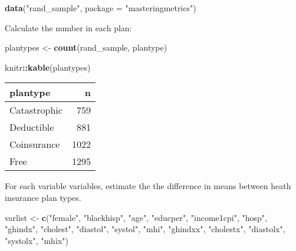 \documentclass[]{book}
\newenvironment{Shaded}{\begin{snugshade}}{\end{snugshade}}
\newcommand{\DataTypeTok}[1]{\textcolor[rgb]{0.13,0.29,0.53}{#1}}
\newcommand{\KeywordTok}[1]{\textcolor[rgb]{0.13,0.29,0.53}{\textbf{#1}}}
\newcommand{\NormalTok}[1]{#1}
\newcommand{\OperatorTok}[1]{\textcolor[rgb]{0.81,0.36,0.00}{\textbf{#1}}}
\newcommand{\StringTok}[1]{\textcolor[rgb]{0.31,0.60,0.02}{#1}}
\theoremstyle{definition}
\theoremstyle{definition}
\theoremstyle{definition}
\theoremstyle{remark}
\begin{document}
\begin{Shaded}
\begin{Highlighting}[]
\KeywordTok{data}\NormalTok{(}\StringTok{"rand_sample"}\NormalTok{, }\DataTypeTok{package =} \StringTok{"masteringmetrics"}\NormalTok{)}
\end{Highlighting}
\end{Shaded}

Calculate the number in each plan:

\begin{Shaded}
\begin{Highlighting}[]
\NormalTok{plantypes <-}\StringTok{ }\KeywordTok{count}\NormalTok{(rand_sample, plantype)}
\end{Highlighting}
\end{Shaded}

\begin{Shaded}
\begin{Highlighting}[]
\NormalTok{knitr}\OperatorTok{::}\KeywordTok{kable}\NormalTok{(plantypes)}
\end{Highlighting}
\end{Shaded}

\begin{tabular}{l|r}
\hline
plantype & n\\
\hline
Catastrophic & 759\\
\hline
Deductible & 881\\
\hline
Coinsurance & 1022\\
\hline
Free & 1295\\
\hline
\end{tabular}

For each variable variables, estimate the the difference in means
between heath insurance plan types.

\begin{Shaded}
\begin{Highlighting}[]
\NormalTok{varlist <-}\StringTok{ }\KeywordTok{c}\NormalTok{(}\StringTok{"female"}\NormalTok{, }\StringTok{"blackhisp"}\NormalTok{, }\StringTok{"age"}\NormalTok{, }\StringTok{"educper"}\NormalTok{,}
             \StringTok{"income1cpi"}\NormalTok{, }\StringTok{"hosp"}\NormalTok{, }\StringTok{"ghindx"}\NormalTok{, }\StringTok{"cholest"}\NormalTok{, }\StringTok{"diastol"}\NormalTok{,}
             \StringTok{"systol"}\NormalTok{, }\StringTok{"mhi"}\NormalTok{, }\StringTok{"ghindxx"}\NormalTok{,}
             \StringTok{"cholestx"}\NormalTok{, }\StringTok{"diastolx"}\NormalTok{, }\StringTok{"systolx"}\NormalTok{, }\StringTok{"mhix"}\NormalTok{)}
\end{Highlighting}
\end{Shaded}
\end{document}

